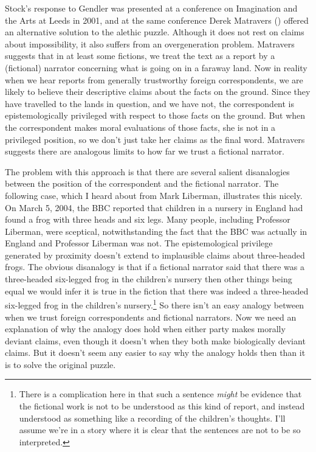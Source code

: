 \documentclass[
  11pt,
  letterpaper,
  DIV=11,
  numbers=noendperiod,
  twoside]{scrartcl}
\begin{document}
Stock's response to Gendler was presented at a conference on Imagination
and the Arts at Leeds in 2001, and at the same conference Derek
Matravers () offered an alternative
solution to the alethic puzzle. Although it does not rest on claims
about impossibility, it also suffers from an overgeneration problem.
Matravers suggests that in at least some fictions, we treat the text as
a report by a (fictional) narrator concerning what is going on in a
faraway land. Now in reality when we hear reports from generally
trustworthy foreign correspondents, we are likely to believe their
descriptive claims about the facts on the ground. Since they have
travelled to the lands in question, and we have not, the correspondent
is epistemologically privileged with respect to those facts on the
ground. But when the correspondent makes moral evaluations of those
facts, she is not in a privileged position, so we don't just take her
claims as the final word. Matravers suggests there are analogous limits
to how far we trust a fictional narrator.

The problem with this approach is that there are several salient
disanalogies between the position of the correspondent and the fictional
narrator. The following case, which I heard about from Mark Liberman,
illustrates this nicely. On March 5, 2004, the BBC reported that
children in a nursery in England had found a frog with three heads and
six legs. Many people, including Professor Liberman, were sceptical,
notwithstanding the fact that the BBC was actually in England and
Professor Liberman was not. The epistemological privilege generated by
proximity doesn't extend to implausible claims about three-headed frogs.
The obvious disanalogy is that if a fictional narrator said that there
was a three-headed six-legged frog in the children's nursery then other
things being equal we would infer it is true in the fiction that there
was indeed a three-headed six-legged frog in the children's
nursery.\footnote{There is a complication here in that such a sentence
  \emph{might} be evidence that the fictional work is not to be
  understood as this kind of report, and instead understood as something
  like a recording of the children's thoughts. I'll assume we're in a
  story where it is clear that the sentences are not to be so
  interpreted.} So there isn't an easy analogy between when we trust
foreign correspondents and fictional narrators. Now we need an
explanation of why the analogy does hold when either party makes morally
deviant claims, even though it doesn't when they both make biologically
deviant claims. But it doesn't seem any easier to say why the analogy
holds then than it is to solve the original puzzle.
\end{document}

